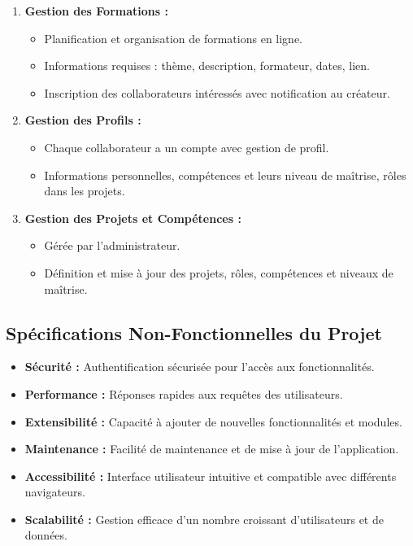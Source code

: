 \documentclass{article}
\begin{document}
\begin{enumerate}
                \item \textbf{Gestion des Formations :}
                \begin{itemize}
                    \item Planification et organisation de formations en ligne.
                    \item Informations requises : thème, description, formateur, dates, lien.
                    \item Inscription des collaborateurs intéressés avec notification au créateur.
                \end{itemize}
                
                \item \textbf{Gestion des Profils :}
                \begin{itemize}
                    \item Chaque collaborateur a un compte avec gestion de profil.
                    \item Informations personnelles, compétences et leurs niveau de maîtrise, rôles dans les projets.
                \end{itemize}
                
                \item \textbf{Gestion des Projets et Compétences :}
                \begin{itemize}
                    \item Gérée par l'administrateur.
                    \item Définition et mise à jour des projets, rôles, compétences et niveaux de maîtrise.
                \end{itemize}
            \end{enumerate}
            
        \subsection{Spécifications Non-Fonctionnelles du Projet}
            \begin{itemize}
                \item \textbf{Sécurité :} Authentification sécurisée pour l'accès aux fonctionnalités.
                \item \textbf{Performance :} Réponses rapides aux requêtes des utilisateurs.
                \item \textbf{Extensibilité :} Capacité à ajouter de nouvelles fonctionnalités et modules.
                \item \textbf{Maintenance :} Facilité de maintenance et de mise à jour de l'application.
                \item \textbf{Accessibilité :} Interface utilisateur intuitive et compatible avec différents navigateurs.
                \item \textbf{Scalabilité :} Gestion efficace d'un nombre croissant d'utilisateurs et de données.
            \end{itemize}
\end{document}
